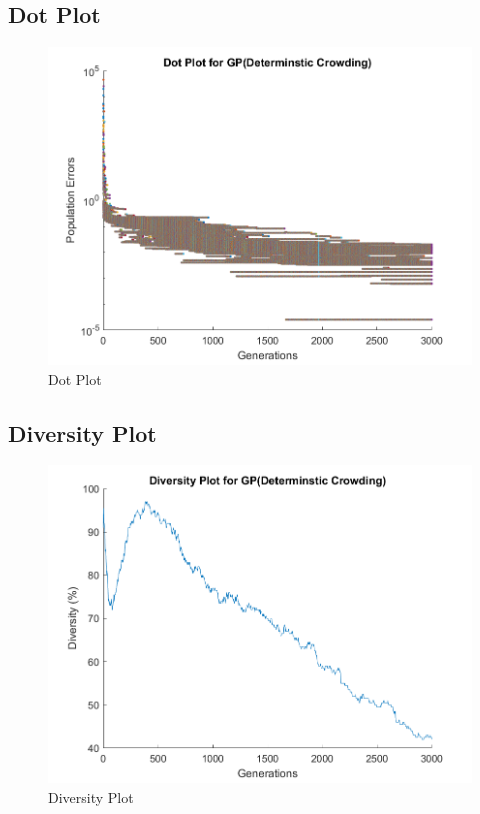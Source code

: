 \documentclass[12pt]{article}
\begin{document}
\subsection{Dot Plot}
\begin{figure}[H]
	\centering
	\includegraphics[width=\textwidth]{dotPlot}
	\caption[]%
	{{\small Dot Plot}}    
\end{figure}
\newpage
\subsection{Diversity Plot}
\begin{figure}[H]
	\centering
	\includegraphics[width=\textwidth]{diversityPlot}
	\caption[]%
	{{\small Diversity Plot}}    
\end{figure}
\end{document}
